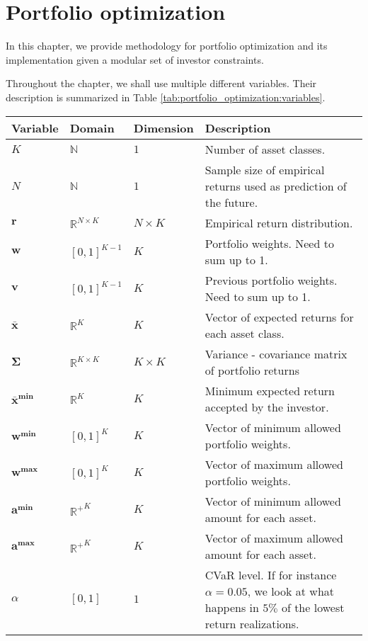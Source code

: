 \chapter{Portfolio optimization}

In this chapter, we provide methodology for portfolio optimization and its implementation given a modular set of investor constraints.

Throughout the chapter, we shall use multiple different variables. Their description is summarized in Table \ref{tab:portfolio_optimization:variables}.

\begin{table}[h]
	\centering
	\begin{tabularx}{0.9\linewidth}{lllX}
		Variable & Domain & Dimension & Description  \\
		\toprule
		\textbf{$K$} & $\mathbb{N}$	& $1$ &  Number of asset classes.\\
		\textbf{$N$} & $\mathbb{N}$	& $1$ &  Sample size of empirical returns used as prediction of the future.\\
		\textbf{$\mathbf{r}$} & $\mathbb{R}^{N\times K}$	& $N\times K$ &  Empirical return distribution.\\			
		\textbf{$\mathbf{w}$} & $[0,1]^{K-1}$& $K$ &  Portfolio weights. Need to sum up to 1.\\
		\textbf{$\mathbf{v}$} & $[0,1]^{K-1}$& $K$ &  Previous portfolio weights. Need to sum up to 1.\\
		\textbf{$\mathbf{\bar{x}}$} & $\mathbb{R}^K$	& $K$ &  Vector of expected returns for each asset class.\\
		\textbf{$\mathbf{\Sigma}$} & $\mathbb{R}^{K\times K}$ & $K\times K$ &  Variance - covariance matrix of portfolio returns\\		
		\textbf{$\mathbf{\bar{x}^{\min}}$} & $\mathbb{R}^K$	& $K$ &  Minimum expected return accepted by the investor.\\				
		\textbf{$\mathbf{w^{\min}}$} & $[0,1]^{K}$	& $K$ &  Vector of minimum allowed portfolio weights.\\						
		\textbf{$\mathbf{w^{\max}}$} & $[0,1]^{K}$	& $K$ &  Vector of maximum allowed portfolio weights.\\
		\textbf{$\mathbf{a^{\min}}$} & $\mathbb{R^+}^K$	& $K$ &  Vector of minimum allowed amount for each asset.\\						
		\textbf{$\mathbf{a^{\max}}$} & $\mathbb{R^+}^K$	& $K$ &  Vector of maximum allowed amount for each asset.\\										
		\textbf{$\alpha$} & $[0,1]$	& $1$ &  CVaR level. If for instance $\alpha=0.05$, we look at what happens in $5\%$ of the lowest return realizations. \\				

\end{tabularx}
\end{table}
